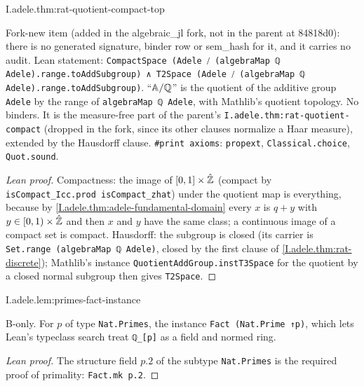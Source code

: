 \begin{theorem}
\end{theorem}
\begin{tfformal}{I.adele.thm:rat-quotient-compact-top}
\begin{tffidelity}
Fork-new item (added in the algebraic\_jl fork, not in the parent at 84818d0): there is no generated signature, binder
row or sem\_hash for it, and it carries no audit. Lean statement: \texttt{CompactSpace (Adele ⧸ (algebraMap ℚ
Adele).range.toAddSubgroup) ∧ T2Space (Adele ⧸ (algebraMap ℚ Adele).range.toAddSubgroup)}. ``$\mathbb{A}/\mathbb{Q}$'' is the quotient
of the additive group \texttt{Adele} by the range of \texttt{algebraMap ℚ Adele}, with Mathlib's quotient topology. No
binders. It is the measure-free part of the parent's \texttt{I.adele.thm:rat-quotient-compact} (dropped in the fork,
since its other clauses normalize a Haar measure), extended by the Hausdorff clause. \texttt{\#print axioms}:
\texttt{propext}, \texttt{Classical.choice}, \texttt{Quot.sound}.
\end{tffidelity}
\end{tfformal}
\begin{proof}[Lean proof]
Compactness: the image of $[0,1]\times\hat{\mathbb{Z}}$ (compact by \texttt{isCompact\_Icc.prod isCompact\_zhat}) under the
quotient map is everything, because by \cref{I.adele.thm:adele-fundamental-domain} every $x$ is $q+y$ with $y\in
[0,1)\times\hat{\mathbb{Z}}$ and then $x$ and $y$ have the same class; a continuous image of a compact set is compact. Hausdorff:
the subgroup is closed (its carrier is \texttt{Set.range (algebraMap ℚ Adele)}, closed by the first clause of
\cref{I.adele.thm:rat-discrete}); Mathlib's instance \texttt{QuotientAddGroup.instT3Space} for the quotient by a closed
normal subgroup then gives \texttt{T2Space}.
\end{proof}
\begin{lemma}
\bonly
{}
\end{lemma}
\begin{tfformal}{I.adele.lem:primes-fact-instance}
\begin{tffidelity}
B-only. For $p$ of type \texttt{Nat.Primes}, the instance \texttt{Fact (Nat.Prime ↑p)}, which lets Lean's typeclass search treat \texttt{ℚ\_[p]} as a field and normed ring.
\end{tffidelity}
\end{tfformal}
\begin{proof}[Lean proof]
The structure field $p.2$ of the subtype \texttt{Nat.Primes} is the required proof of primality: \texttt{Fact.mk p.2}.
\end{proof}

